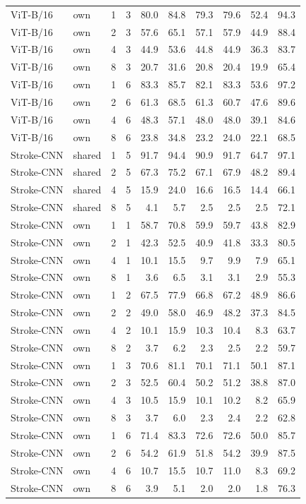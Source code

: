 \documentclass[10pt,a4paper]{article}
\begin{document}
\begin{longtable}{llrrrrrrrr}
ViT-B/16 & own & 1 & 3 & 80.0 & 84.8 & 79.3 & 79.6 & 52.4 & 94.3 \\
ViT-B/16 & own & 2 & 3 & 57.6 & 65.1 & 57.1 & 57.9 & 44.9 & 88.4 \\
ViT-B/16 & own & 4 & 3 & 44.9 & 53.6 & 44.8 & 44.9 & 36.3 & 83.7 \\
ViT-B/16 & own & 8 & 3 & 20.7 & 31.6 & 20.8 & 20.4 & 19.9 & 65.4 \\
ViT-B/16 & own & 1 & 6 & 83.3 & 85.7 & 82.1 & 83.3 & 53.6 & 97.2 \\
ViT-B/16 & own & 2 & 6 & 61.3 & 68.5 & 61.3 & 60.7 & 47.6 & 89.6 \\
ViT-B/16 & own & 4 & 6 & 48.3 & 57.1 & 48.0 & 48.0 & 39.1 & 84.6 \\
ViT-B/16 & own & 8 & 6 & 23.8 & 34.8 & 23.2 & 24.0 & 22.1 & 68.5 \\
Stroke-CNN & shared & 1 & 5 & 91.7 & 94.4 & 90.9 & 91.7 & 64.7 & 97.1 \\
Stroke-CNN & shared & 2 & 5 & 67.3 & 75.2 & 67.1 & 67.9 & 48.2 & 89.4 \\
Stroke-CNN & shared & 4 & 5 & 15.9 & 24.0 & 16.6 & 16.5 & 14.4 & 66.1 \\
Stroke-CNN & shared & 8 & 5 & 4.1 & 5.7 & 2.5 & 2.5 & 2.5 & 72.1 \\
Stroke-CNN & own & 1 & 1 & 58.7 & 70.8 & 59.9 & 59.7 & 43.8 & 82.9 \\
Stroke-CNN & own & 2 & 1 & 42.3 & 52.5 & 40.9 & 41.8 & 33.3 & 80.5 \\
Stroke-CNN & own & 4 & 1 & 10.1 & 15.5 & 9.7 & 9.9 & 7.9 & 65.1 \\
Stroke-CNN & own & 8 & 1 & 3.6 & 6.5 & 3.1 & 3.1 & 2.9 & 55.3 \\
Stroke-CNN & own & 1 & 2 & 67.5 & 77.9 & 66.8 & 67.2 & 48.9 & 86.6 \\
Stroke-CNN & own & 2 & 2 & 49.0 & 58.0 & 46.9 & 48.2 & 37.3 & 84.5 \\
Stroke-CNN & own & 4 & 2 & 10.1 & 15.9 & 10.3 & 10.4 & 8.3 & 63.7 \\
Stroke-CNN & own & 8 & 2 & 3.7 & 6.2 & 2.3 & 2.5 & 2.2 & 59.7 \\
Stroke-CNN & own & 1 & 3 & 70.6 & 81.1 & 70.1 & 71.1 & 50.1 & 87.1 \\
Stroke-CNN & own & 2 & 3 & 52.5 & 60.4 & 50.2 & 51.2 & 38.8 & 87.0 \\
Stroke-CNN & own & 4 & 3 & 10.5 & 15.9 & 10.1 & 10.2 & 8.2 & 65.9 \\
Stroke-CNN & own & 8 & 3 & 3.7 & 6.0 & 2.3 & 2.4 & 2.2 & 62.8 \\
Stroke-CNN & own & 1 & 6 & 71.4 & 83.3 & 72.6 & 72.6 & 50.0 & 85.7 \\
Stroke-CNN & own & 2 & 6 & 54.2 & 61.9 & 51.8 & 54.2 & 39.9 & 87.5 \\
Stroke-CNN & own & 4 & 6 & 10.7 & 15.5 & 10.7 & 11.0 & 8.3 & 69.2 \\
Stroke-CNN & own & 8 & 6 & 3.9 & 5.1 & 2.0 & 2.0 & 1.8 & 76.3 \\

\end{longtable}
\normalsize
\end{document}
